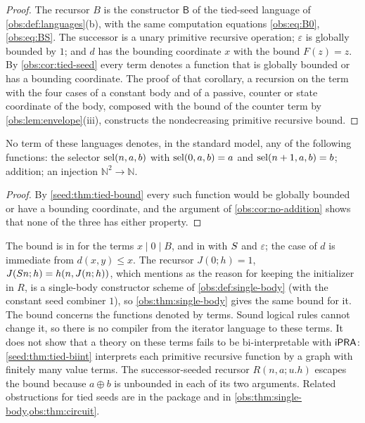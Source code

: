 \begin{proof}
The recursor $B$ is the constructor $\mathsf B$ of the tied-seed language of
\cref{obs:def:languages}(b), with the same computation equations
\eqref{obs:eq:B0}, \eqref{obs:eq:BS}. The successor is a unary primitive
recursive operation; $\varepsilon$ is globally bounded by $1$; and $d$ has
the bounding coordinate $x$ with the bound $F(z)=z$. By
\cref{obs:cor:tied-seed} every term denotes a function that is globally
bounded or has a bounding coordinate. The proof of that corollary, a
recursion on the term with the four cases of a constant body and of a
passive, counter or state coordinate of the body, composed with the bound of
the counter term by \cref{obs:lem:envelope}(iii), constructs the
nondecreasing primitive recursive bound.
\end{proof}

\begin{corollary}\label{seed:cor:tied-noterms}
No term of these languages denotes, in the standard model, any of the
following functions: the selector $\operatorname{sel}(n,a,b)$ with $\operatorname{sel}(0,a,b)=a$ and
$\operatorname{sel}(n+1,a,b)=b$; addition; an injection $\mathbb N^2\to\mathbb N$.
\end{corollary}

\begin{proof}
By \cref{seed:thm:tied-bound} every such function would be globally bounded
or have a bounding coordinate, and the argument of \cref{obs:cor:no-addition}
shows that none of the three has either property.
\end{proof}

\begin{remark}\label{seed:rem:tied-bound-scope}
The bound is in  for the terms $x\mid0\mid B$, and in
 with $S$ and $\varepsilon$; the case of $d$ is
immediate from $d(x,y)\leq x$. The recursor $J(0;h)=1$,
$J(S n;h)=h(n,J(n;h))$, which  mentions as the
reason for keeping the initializer in $R$, is a single-body constructor
scheme of \cref{obs:def:single-body} (with the constant seed combiner $1$),
so \cref{obs:thm:single-body} gives the same bound for it. The bound concerns the
functions denoted by terms. Sound logical rules cannot change it, so there is
no compiler from the iterator language to these terms. It does not show that
a theory on these terms fails to be bi-interpretable with $\mathsf{iPRA}$:
\cref{seed:thm:tied-biint} interprets each primitive recursive function by a
graph with finitely many value terms. The successor-seeded recursor
$R(n,a;u.h)$ escapes the bound because $a\oplus b$ is unbounded in each of
its two arguments. Related obstructions for tied seeds are in the package
 and in \cref{obs:thm:single-body,obs:thm:circuit}.
\end{remark}

